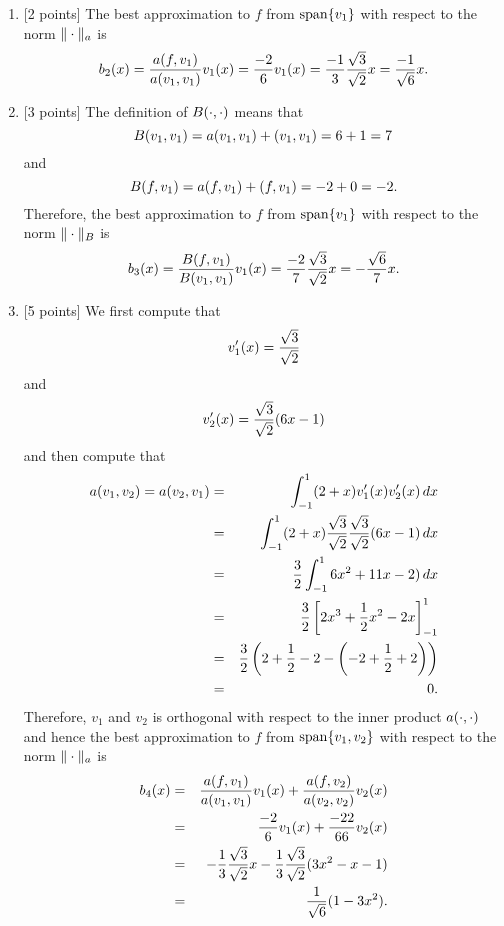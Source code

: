 \begin{solution}
\begin{enumerate}
\item {[2 points]} The best approximation to $f$ from ${\rm span}\{v_1\}$ with respect to the norm $\|\cdot\|_a$ is
\[
b_2(x)={a(f,v_1) \over a(v_1,v_1)}v_1(x)={-2 \over 6}v_1(x)={-1 \over 3}{\sqrt{3} \over \sqrt{2}}x={-1 \over \sqrt{6}}x.
\]

\item {[3 points]} The definition of $B(\cdot,\cdot)$ means that
\[
B(v_1,v_1)=a(v_1,v_1)+(v_1,v_1)=6+1=7
\]
and
\[
B(f,v_1)=a(f,v_1)+(f,v_1)=-2+0=-2.
\]
Therefore, the best approximation to $f$ from ${\rm span}\{v_1\}$ with respect to the norm $\|\cdot\|_B$ is
\[
b_3(x)={B(f,v_1) \over B(v_1,v_1)}v_1(x)={-2 \over 7}{\sqrt{3} \over \sqrt{2}}x=-{\sqrt{6} \over 7}x.
\]

\item {[5 points]} We first compute that
\[
v_1'(x)={\sqrt{3} \over \sqrt{2}}
\]
and
\[
v_2'(x)={\sqrt{3} \over \sqrt{2}}(6x-1)
\]
and then compute that
\begin{eqnarray*}
a(v_1,v_2)=a(v_2,v_1)&=&\int_{-1}^1(2+x)v_1'(x)v_2'(x)\,dx
\\
&=&\int_{-1}^1(2+x){\sqrt{3} \over \sqrt{2}}{\sqrt{3} \over \sqrt{2}}(6x-1)\,dx
\\
&=&{3 \over 2}\int_{-1}^16x^2+11x-2)\,dx
\\
&=&{3 \over 2}\left[2x^3+{1 \over 2}x^2-2x\right]_{-1}^1
\\
&=&{3 \over 2}\left(2+{1 \over 2}-2-\left(-2+{1 \over 2}+2\right)\right)
\\
&=&0.
\end{eqnarray*}
Therefore, $v_1$ and $v_2$ is orthogonal with respect to the inner product $a(\cdot,\cdot)$ and hence the best approximation to $f$ from ${\rm span}\{v_1,v_2\}$ with respect to the norm $\|\cdot\|_a$ is
\begin{eqnarray*}
b_4(x)&=&{a(f,v_1) \over a(v_1,v_1)}v_1(x)+{a(f,v_2) \over a(v_2,v_2)}v_2(x)
\\
&=&{-2 \over 6}v_1(x)+{-22 \over 66}v_2(x)
\\
&=&-{1 \over 3}{\sqrt{3} \over \sqrt{2}}x-{1 \over 3}{\sqrt{3} \over \sqrt{2}}(3x^2-x-1)
\\
&=&{1 \over \sqrt{6}}(1-3x^2).
\end{eqnarray*}


\end{enumerate}
\end{solution}
